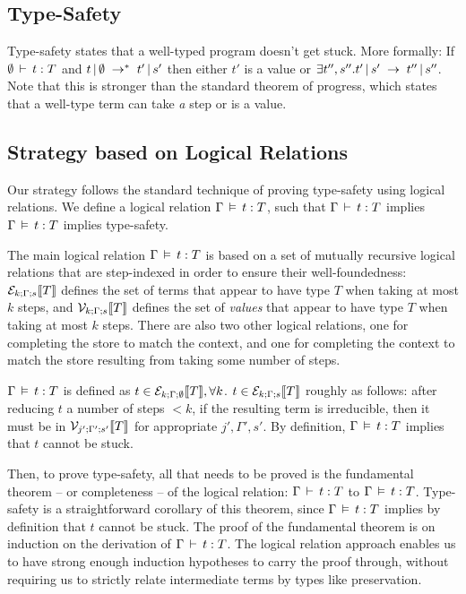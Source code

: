 \documentclass[9pt]{sigplanconf}
\begin{document}
\subsection{Type-Safety}
Type-safety states that a well-typed program doesn't get stuck. More
formally: If $\emptyset \ts t \typ T$ and $\reductionl t \emptyset
{t'} {s'} *$ then either $t'$ is a value or $\exists t'',
s''. \reduction {t'} {s'} {t''} {s''}$. Note that this is stronger
than the standard theorem of progress, which states that a well-type
term can take \emph{a} step or is a value.

\subsection{Strategy based on Logical Relations}
Our strategy follows the standard technique of proving type-safety
using logical relations. We define a logical relation $\Gamma \ds t
: T$, such that $\Gamma \ts t : T$ implies $\Gamma \ds t : T$ implies
type-safety.

The main logical relation $\Gamma \ds t : T$ is based on a set of
mutually recursive logical relations that are step-indexed in order to
ensure their well-foundedness: $\rele k \Gamma s T$ defines the set of
terms that appear to have type $T$ when taking at most $k$ steps, and
$\relv k \Gamma s T$ defines the set of \emph{values} that appear to
have type $T$ when taking at most $k$ steps. There are also two other
logical relations, one for completing the store to match the context,
and one for completing the context to match the store resulting from
taking some number of steps.

$\Gamma \ds t : T$ is defined as $t \in \rele k \Gamma \emptyset T,
\forall k$. $t \in \rele k \Gamma s T$ roughly as follows: after
reducing $t$ a number of steps $<k$, if the resulting term is
irreducible, then it must be in $\relv {j'} {\Gamma'} {s'} T$ for
appropriate $j', \Gamma',s'$. By definition, $\Gamma \ds t : T$
implies that $t$ cannot be stuck.

Then, to prove type-safety, all that needs to be proved is the
fundamental theorem -- or completeness -- of the logical relation:
$\Gamma \ts t : T$ to $\Gamma \ds t : T$. Type-safety is a
straightforward corollary of this theorem, since $\Gamma \ds t : T$
implies by definition that $t$ cannot be stuck. The proof of the
fundamental theorem is on induction on the derivation of $\Gamma \ts t
: T$. The logical relation approach enables us to have strong enough
induction hypotheses to carry the proof through, without requiring us
to strictly relate intermediate terms by types like preservation.
\end{document}
